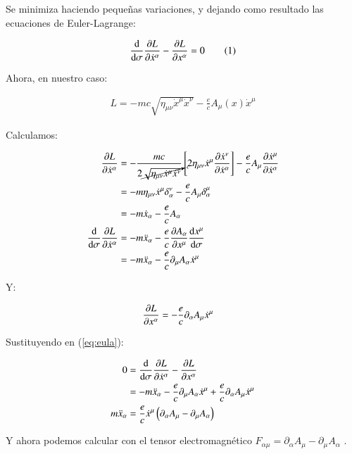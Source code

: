 Se minimiza haciendo pequeñas variaciones, y dejando como resultado las ecuaciones de Euler-Lagrange:

\begin{align*}
    \dv{\sigma}\pdv{L}{\dot{x}^\alpha}-\pdv{L}{x^\alpha}=0\tag{1}\label{eq:eula}
\end{align*}

Ahora, en nuestro caso:

\begin{align*}
    L = -mc\sqrt{\eta_{\mu\nu}\dot{x}^\mu\dot{x}^\nu}-\frac{e}{c}A_\mu(x)\dot{x}^\mu
\end{align*}

Calculamos:

\begin{align*}
    \pdv{L}{\dot{x}^\alpha}
    &=-\frac{mc}{2\cancelto{c}{\sqrt{\eta_{\mu\nu}\dot{x}^\mu\dot{x}^\nu}}}\left[2\eta_{\mu\nu}\dot{x}^\mu\pdv{\dot{x}^\nu}{\dot{x}^\alpha}\right]-\frac{e}{c}A_\mu\pdv{\dot{x}^\mu}{\dot{x}^\alpha}\\
    &=-m\eta_{\mu\nu}\dot{x}^\mu\delta^\nu_\alpha-\frac{e}{c}A_\mu\delta^\mu_\alpha\\
    &=-m\dot{x}_\alpha-\frac{e}{c}A_\alpha\\
    \dv{\sigma}\pdv{L}{\dot{x}^\alpha}
    &=-m\ddot{x}_\alpha-\frac{e}{c}\pdv{A_\alpha}{x^\mu}\dv{x^\mu}{\sigma}\\
    &=-m\ddot{x}_\alpha - \frac{e}{c}\partial_\mu A_\alpha \dot{x}^\mu
\end{align*}

Y:


\begin{align*}
    \pdv{L}{x^\alpha}
    &=-\frac{e}{c}\partial_\alpha A_\mu \dot{x}^\mu
\end{align*}

Sustituyendo en (\ref{eq:eula}):

\begin{align*}
    0&=\dv{\sigma}\pdv{L}{\dot{x}^\alpha}-\pdv{L}{x^\alpha}\\
    &= -m\ddot{x}_\alpha - \frac{e}{c}\partial_\mu A_\alpha \dot{x}^\mu+\frac{e}{c}\partial_\alpha A_\mu \dot{x}^\mu\\
    m\ddot{x}_\alpha &= \frac{e}{c}\dot{x}^\mu\left(\partial_\alpha A_\mu - \partial_\mu A_\alpha\right)\\
\end{align*}

Y ahora podemos calcular con el tensor electromagnético $F_{\alpha\mu}=\partial_\alpha A_\mu - \partial_\mu A_\alpha$ \cite{Electrom}.

